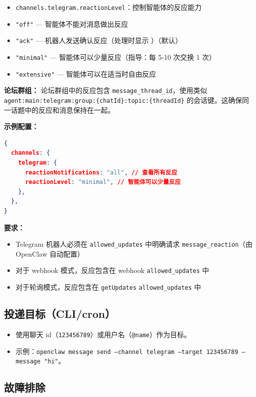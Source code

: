 \begin{itemize}
  \item \texttt{channels.telegram.reactionLevel}：控制智能体的反应能力
  \item \texttt{"off"} — 智能体不能对消息做出反应
  \item \texttt{"ack"} — 机器人发送确认反应（处理时显示 ）（默认）
  \item \texttt{"minimal"} — 智能体可以少量反应（指导：每 5-10 次交换 1 次）
  \item \texttt{"extensive"} — 智能体可以在适当时自由反应
\end{itemize}


\textbf{论坛群组：} 论坛群组中的反应包含 \texttt{message\_thread\_id}，使用类似 \texttt{agent:main:telegram:group:\{chatId\}:topic:\{threadId\}} 的会话键。这确保同一话题中的反应和消息保持在一起。

\textbf{示例配置：}

\begin{lstlisting}[language=json]
{
  channels: {
    telegram: {
      reactionNotifications: "all", // 查看所有反应
      reactionLevel: "minimal", // 智能体可以少量反应
    },
  },
}
\end{lstlisting}


\textbf{要求：}

\begin{itemize}
  \item Telegram 机器人必须在 \texttt{allowed\_updates} 中明确请求 \texttt{message\_reaction}（由 OpenClaw 自动配置）
  \item 对于 webhook 模式，反应包含在 webhook \texttt{allowed\_updates} 中
  \item 对于轮询模式，反应包含在 \texttt{getUpdates} \texttt{allowed\_updates} 中
\end{itemize}


\subsection{投递目标（CLI/cron）}


\begin{itemize}
  \item 使用聊天 id（\texttt{123456789}）或用户名（\texttt{@name}）作为目标。
  \item 示例：\texttt{openclaw message send --channel telegram --target 123456789 --message "hi"}。
\end{itemize}


\subsection{故障排除}


